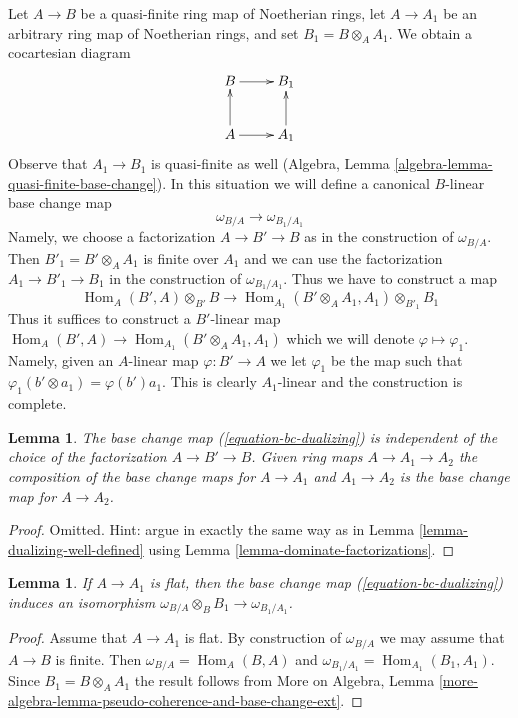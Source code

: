 \documentclass{stacks-project}
\theoremstyle{plain}
\newtheorem{lemma}[subsection]{Lemma}
\theoremstyle{definition}
\theoremstyle{remark}
\numberwithin{equation}{subsection}
\def\Hom{\mathop{\mathrm{Hom}}\nolimits}
\begin{document}
\noindent
Let $A \to B$ be a quasi-finite ring map of Noetherian rings, let
$A \to A_1$ be an arbitrary ring map of Noetherian rings, and set
$B_1 = B \otimes_A A_1$. We obtain a cocartesian diagram
$$
\xymatrix{
B \ar[r] & B_1 \\
A \ar[u] \ar[r] & A_1 \ar[u]
}
$$
Observe that $A_1 \to B_1$ is quasi-finite as well (Algebra, Lemma
\ref{algebra-lemma-quasi-finite-base-change}).
In this situation we will define a canonical
$B$-linear base change map
\begin{equation}
\label{equation-bc-dualizing}
\omega_{B/A} \longrightarrow \omega_{B_1/A_1}
\end{equation}
Namely, we choose a factorization $A \to B' \to B$ as in the construction
of $\omega_{B/A}$. Then $B'_1 = B' \otimes_A A_1$ is finite over $A_1$
and we can use the factorization $A_1 \to B'_1 \to B_1$ in the construction
of $\omega_{B_1/A_1}$. Thus we have to construct a map
$$
\Hom_A(B', A) \otimes_{B'} B
\longrightarrow
\Hom_{A_1}(B' \otimes_A A_1, A_1) \otimes_{B'_1} B_1
$$
Thus it suffices to construct a $B'$-linear map
$\Hom_A(B', A) \to \Hom_{A_1}(B' \otimes_A A_1, A_1)$
which we will denote $\varphi \mapsto \varphi_1$.
Namely, given an $A$-linear map $\varphi : B' \to A$ we
let $\varphi_1$ be the map such that
$\varphi_1(b' \otimes a_1) = \varphi(b')a_1$.
This is clearly $A_1$-linear and the construction is complete.

\begin{lemma}
\label{lemma-bc-map-dualizing}
The base change map (\ref{equation-bc-dualizing})
is independent of the choice of the
factorization $A \to B' \to B$. Given ring maps $A \to A_1 \to A_2$
the composition of the base change maps for $A \to A_1$ and $A_1 \to A_2$
is the base change map for $A \to A_2$.
\end{lemma}

\begin{proof}
Omitted. Hint: argue in exactly the same way as in
Lemma \ref{lemma-dualizing-well-defined}
using Lemma \ref{lemma-dominate-factorizations}.
\end{proof}

\begin{lemma}
\label{lemma-dualizing-flat-base-change}
If $A \to A_1$ is flat, then
the base change map (\ref{equation-bc-dualizing}) induces an isomorphism
$\omega_{B/A} \otimes_B B_1 \to \omega_{B_1/A_1}$.
\end{lemma}

\begin{proof}
Assume that $A \to A_1$ is flat. By construction of $\omega_{B/A}$ we may
assume that $A \to B$ is finite. Then $\omega_{B/A} = \Hom_A(B, A)$ and
$\omega_{B_1/A_1} = \Hom_{A_1}(B_1, A_1)$. Since $B_1 = B \otimes_A A_1$
the result follows from More on Algebra, Lemma
\ref{more-algebra-lemma-pseudo-coherence-and-base-change-ext}.
\end{proof}
\end{document}

